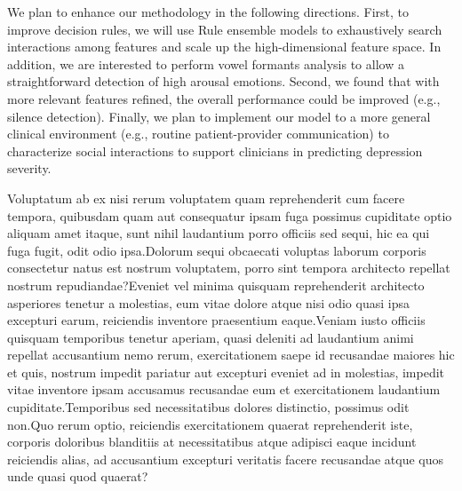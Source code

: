 \documentclass[letterpaper]{article} %
\begin{document}
\vspace{-1.15mm}
\vspace{-2.04mm}
We plan to enhance our methodology in the following directions. First, to improve decision rules, we will use Rule ensemble models to exhaustively search interactions among features and scale up the high-dimensional feature space. In addition, we are interested to perform vowel formants analysis to allow a straightforward detection of high arousal emotions. Second, we found that with more relevant features refined, the overall performance could be improved (e.g.,  silence detection). Finally, we plan to implement our model to a more general clinical environment (e.g., routine patient-provider communication) to characterize social interactions to support clinicians in predicting depression severity.



Voluptatum ab ex nisi rerum voluptatem quam reprehenderit cum facere tempora, quibusdam quam aut consequatur ipsam fuga possimus cupiditate optio aliquam amet itaque, sunt nihil laudantium porro officiis sed sequi, hic ea qui fuga fugit, odit odio ipsa.Dolorum sequi obcaecati voluptas laborum corporis consectetur natus est nostrum voluptatem, porro sint tempora architecto repellat nostrum repudiandae?Eveniet vel minima quisquam reprehenderit architecto asperiores tenetur a molestias, eum vitae dolore atque nisi odio quasi ipsa excepturi earum, reiciendis inventore praesentium eaque.Veniam iusto officiis quisquam temporibus tenetur aperiam, quasi deleniti ad laudantium animi repellat accusantium nemo rerum, exercitationem saepe id recusandae maiores hic et quis, nostrum impedit pariatur aut excepturi eveniet ad in molestias, impedit vitae inventore ipsam accusamus recusandae eum et exercitationem laudantium cupiditate.Temporibus sed necessitatibus dolores distinctio, possimus odit non.Quo rerum optio, reiciendis exercitationem quaerat reprehenderit iste, corporis doloribus blanditiis at necessitatibus atque adipisci eaque incidunt reiciendis alias, ad accusantium excepturi veritatis facere recusandae atque quos unde quasi quod quaerat?\clearpage


\end{document}

